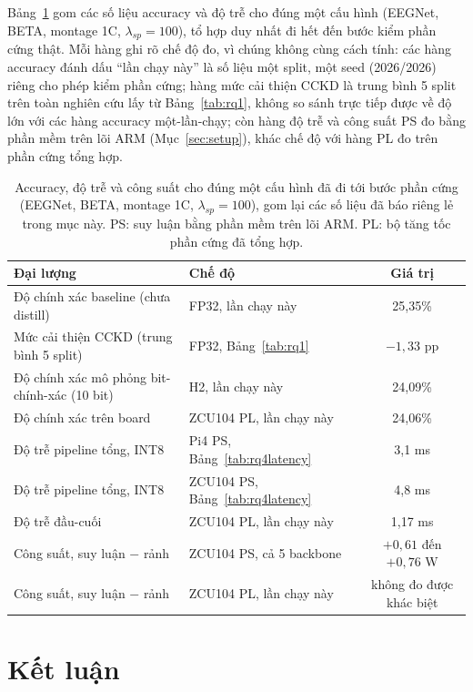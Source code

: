 \documentclass[11pt,a4paper,twoside,asymmetric]{article}
\begin{document}
Bảng~\ref{tab:deploysummary} gom các số liệu accuracy và độ trễ cho đúng một cấu hình (EEGNet, BETA, montage 1C, $\lambda_{sp}=100$), tổ hợp duy nhất đi hết đến bước kiểm phần cứng thật. Mỗi hàng ghi rõ chế độ đo, vì chúng không cùng cách tính: các hàng accuracy đánh dấu ``lần chạy này'' là số liệu một split, một seed (2026/2026) riêng cho phép kiểm phần cứng; hàng mức cải thiện CCKD là trung bình 5 split trên toàn nghiên cứu lấy từ Bảng~\ref{tab:rq1}, không so sánh trực tiếp được về độ lớn với các hàng accuracy một-lần-chạy; còn hàng độ trễ và công suất PS đo bằng phần mềm trên lõi ARM (Mục~\ref{sec:setup}), khác chế độ với hàng PL đo trên phần cứng tổng hợp.

\begin{table}[htbp]
\caption{Accuracy, độ trễ và công suất cho đúng một cấu hình đã đi tới bước phần cứng (EEGNet, BETA, montage 1C, $\lambda_{sp}=100$), gom lại các số liệu đã báo riêng lẻ trong mục này. PS: suy luận bằng phần mềm trên lõi ARM. PL: bộ tăng tốc phần cứng đã tổng hợp.}
\label{tab:deploysummary}
\begin{center}
\footnotesize
\begin{tabular}{llc}
\toprule
Đại lượng & Chế độ & Giá trị \\
\midrule
Độ chính xác baseline (chưa distill) & FP32, lần chạy này & 25,35\% \\
Mức cải thiện CCKD (trung bình 5 split) & FP32, Bảng~\ref{tab:rq1} & $-1,33$ pp \\
Độ chính xác mô phỏng bit-chính-xác (10 bit) & H2, lần chạy này & 24,09\% \\
Độ chính xác trên board & ZCU104 PL, lần chạy này & 24,06\% \\
Độ trễ pipeline tổng, INT8 & Pi4 PS, Bảng~\ref{tab:rq4latency} & 3,1 ms \\
Độ trễ pipeline tổng, INT8 & ZCU104 PS, Bảng~\ref{tab:rq4latency} & 4,8 ms \\
Độ trễ đầu-cuối & ZCU104 PL, lần chạy này & 1,17 ms \\
Công suất, suy luận $-$ rảnh & ZCU104 PS, cả 5 backbone & $+0,61$ đến $+0,76$ W \\
Công suất, suy luận $-$ rảnh & ZCU104 PL, lần chạy này & không đo được khác biệt \\
\bottomrule
\end{tabular}
\end{center}
\end{table}

\section{Kết luận}
\end{document}
